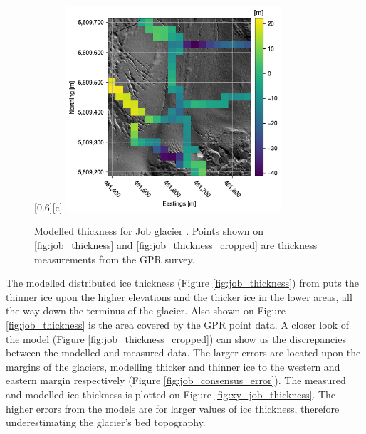 \documentclass[a4, 12pt]{article}
\newcommand{\fref}[1]{(Figure \ref{#1})}
\begin{document}
\begin{figure}[h!]
{\hfill
{}[0.6\linewidth][c]{
\includegraphics[width=8cm]{../imgs/Job glacier/consensus_cropped_error.png}}
}
\caption{Modelled thickness for Job glacier \citep{farinotti2019consensus}. Points shown on \ref{fig:job_thickness} and \ref{fig:job_thickness_cropped} are thickness measurements from the GPR survey.}

\end{figure}

The modelled distributed ice thickness \fref{fig:job_thickness} from \citet{farinotti2019consensus} puts the thinner ice upon the higher elevations and the thicker ice in the lower areas, all the way down the terminus of the glacier. Also shown on Figure \ref{fig:job_thickness} is the area covered by the GPR point data. A closer look of the model \fref{fig:job_thickness_cropped} can show us the discrepancies between the modelled and measured data. The larger errors are located upon the margins of the glaciers, modelling thicker and thinner ice to the western and eastern margin respectively \fref{fig:job_consensus_error}. The measured and modelled ice thickness is plotted on Figure \ref{fig:xy_job_thickness}. The higher errors from the models are for larger values of ice thickness, therefore underestimating the glacier's bed topography.
\FloatBarrier
\end{document}
